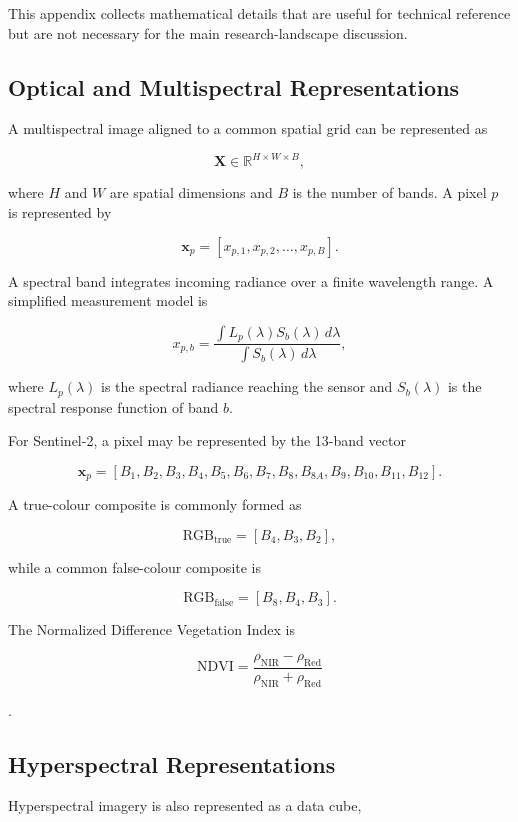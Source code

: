 \documentclass[
    11pt,
    a4paper,
    parskip=half,
    bibliography=totoc,
    numbers=noenddot
]{scrartcl}
\begin{document}
This appendix collects mathematical details that are useful for technical
reference but are not necessary for the main research-landscape
discussion.

\subsection{Optical and Multispectral Representations}

A multispectral image aligned to a common spatial grid can be represented
as

\[
\mathbf{X}\in\mathbb{R}^{H\times W\times B},
\]

where \(H\) and \(W\) are spatial dimensions and \(B\) is the number of
bands. A pixel \(p\) is represented by

\[
\mathbf{x}_p =
\left[
x_{p,1},
x_{p,2},
\ldots,
x_{p,B}
\right].
\]

A spectral band integrates incoming radiance over a finite wavelength
range. A simplified measurement model is

\[
x_{p,b}
=
\frac{
    \int L_p(\lambda)S_b(\lambda)\,d\lambda
}{
    \int S_b(\lambda)\,d\lambda
},
\]

where \(L_p(\lambda)\) is the spectral radiance reaching the sensor and
\(S_b(\lambda)\) is the spectral response function of band \(b\).

For Sentinel-2, a pixel may be represented by the 13-band vector

\[
\mathbf{x}_p =
\left[
B_1,B_2,B_3,B_4,B_5,B_6,B_7,B_8,B_{8A},B_9,B_{10},B_{11},B_{12}
\right].
\]

A true-colour composite is commonly formed as

\[
\mathrm{RGB}_{\mathrm{true}}=[B_4,B_3,B_2],
\]

while a common false-colour composite is

\[
\mathrm{RGB}_{\mathrm{false}}=[B_8,B_4,B_3].
\]

The Normalized Difference Vegetation Index is

\[
\mathrm{NDVI}
=
\frac{\rho_{\mathrm{NIR}}-\rho_{\mathrm{Red}}}
     {\rho_{\mathrm{NIR}}+\rho_{\mathrm{Red}}}
\]

\cite{rouse1974monitoring}.

\subsection{Hyperspectral Representations}

Hyperspectral imagery is also represented as a data cube,
\end{document}
